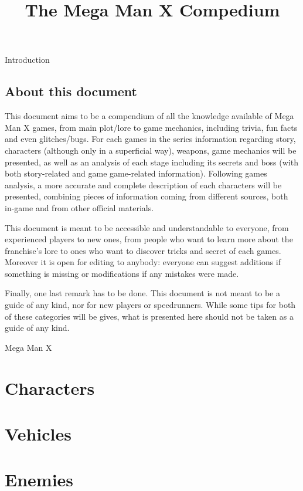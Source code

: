 \documentclass[openany]{report}
\title{The Mega Man X Compedium}
\begin{document}
\maketitle
\tableofcontents

\begin{chapter}{Introduction}
	\section{About this document}
	
	
	This document aims to be a compendium of all the knowledge available of Mega Man X games, from main plot/lore to game mechanics, including trivia, fun facts and even glitches/bugs. For each games in the series information regarding story, characters (although only in a superficial way), weapons, game mechanics will be presented, as well as an analysis of each stage including its secrets and boss (with both story-related and game game-related information). Following games analysis, a more accurate and complete description of each characters will be presented, combining pieces of information coming from different sources, both in-game and from other official materials.
	
	This document is meant to be accessible and understandable to everyone, from experienced players to new ones, from people who want to learn more about the franchise's lore to ones who want to discover tricks and secret of each games. Moreover it is open for editing to anybody: everyone can suggest additions if something is missing or modifications if any mistakes were made.
	
	Finally, one last remark has to be done. This document is not meant to be a guide of any kind, nor for new players or speedrunners. While some tips for both of these categories will be gives, what is presented here should not be taken as a guide of any kind.
\end{chapter}

\begin{chapter}{Mega Man X}
	
\end{chapter}



\begin{appendices}
	\chapter {Characters}
	\chapter {Vehicles}
	
	
	\chapter{Enemies}
	
\end{appendices}

 

\end{document}
